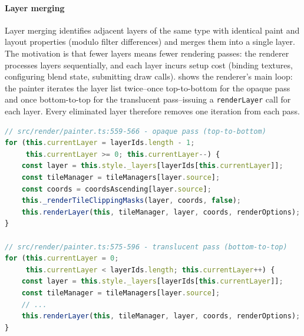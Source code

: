 \paragraph{Layer merging}
Layer merging identifies adjacent layers of the same type with identical paint and layout properties (modulo filter differences) and merges them into a single layer.
The motivation is that fewer layers means fewer rendering passes: the renderer processes layers sequentially, and each layer incurs setup cost (binding textures, configuring blend state, submitting draw calls).
 shows the renderer's main loop: the painter iterates the layer list twice--once top-to-bottom for the opaque pass and once bottom-to-top for the translucent pass--issuing a \texttt{renderLayer} call for each layer.
Every eliminated layer therefore removes one iteration from each pass.

\begin{lstlisting}[language=TypeScript,caption={MapLibre GL-JS painter render loop (\texttt{src/render/painter.ts:559-596})},label=lst:painter_loop]
// src/render/painter.ts:559-566 - opaque pass (top-to-bottom)
for (this.currentLayer = layerIds.length - 1;
     this.currentLayer >= 0; this.currentLayer--) {
    const layer = this.style._layers[layerIds[this.currentLayer]];
    const tileManager = tileManagers[layer.source];
    const coords = coordsAscending[layer.source];
    this._renderTileClippingMasks(layer, coords, false);
    this.renderLayer(this, tileManager, layer, coords, renderOptions);
}

// src/render/painter.ts:575-596 - translucent pass (bottom-to-top)
for (this.currentLayer = 0;
     this.currentLayer < layerIds.length; this.currentLayer++) {
    const layer = this.style._layers[layerIds[this.currentLayer]];
    const tileManager = tileManagers[layer.source];
    // ...
    this.renderLayer(this, tileManager, layer, coords, renderOptions);
}
\end{lstlisting}

